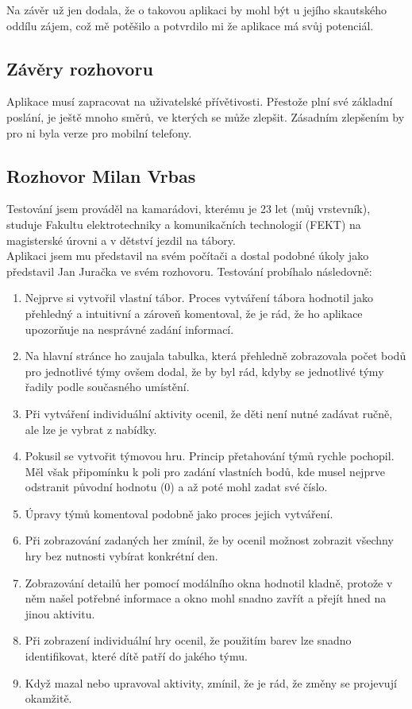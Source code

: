 \documentclass[a4paper, 12pt]{article} %
\begin{document}
Na závěr už jen dodala, že o takovou aplikaci by mohl být u jejího skautského oddílu zájem, což mě potěšilo a potvrdilo mi že aplikace má svůj potenciál.

\subsection*{Závěry rozhovoru}
Aplikace musí zapracovat na uživatelské přívětivosti. Přestože plní své základní poslání, je ještě mnoho směrů, ve kterých se může zlepšit. Zásadním zlepšením by pro ni byla verze pro mobilní telefony. 

\subsection{Rozhovor Milan Vrbas}
Testování jsem prováděl na kamarádovi, kterému je 23 let (můj vrstevník), studuje Fakultu 
elektrotechniky a komunikačních technologií (FEKT) na magisterské úrovni a v dětství jezdil 
na tábory. \\
Aplikaci jsem mu představil na svém počítači a dostal podobné úkoly jako představil Jan Juračka
ve svém rozhovoru. Testování probíhalo následovně:
\begin{enumerate}
    \item Nejprve si vytvořil vlastní tábor. Proces vytváření tábora hodnotil jako přehledný 
    a intuitivní a zároveň komentoval, že je rád, že ho aplikace upozorňuje na nesprávné 
    zadání informací.
    \item Na hlavní stránce ho zaujala tabulka, která přehledně zobrazovala počet bodů pro 
    jednotlivé týmy ovšem dodal, že by byl rád, kdyby se jednotlivé týmy řadily podle 
    současného umístění.
    \item Při vytváření individuální aktivity ocenil, že děti není nutné zadávat ručně, ale 
    lze je vybrat z nabídky.
    \item Pokusil se vytvořit týmovou hru. Princip přetahování týmů rychle pochopil. Měl však 
    připomínku k poli pro zadání vlastních bodů, kde musel nejprve odstranit původní hodnotu 
    (0) a až poté mohl zadat své číslo.
    \item Úpravy týmů komentoval podobně jako proces jejich vytváření.
    \item Při zobrazování zadaných her zmínil, že by ocenil možnost zobrazit všechny hry bez 
    nutnosti vybírat konkrétní den.
    \item Zobrazování detailů her pomocí modálního okna hodnotil kladně, protože v něm našel 
    potřebné informace a okno mohl snadno zavřít a přejít hned na jinou aktivitu.
    \item Při zobrazení individuální hry ocenil, že použitím barev lze snadno identifikovat, 
    které dítě patří do jakého týmu.
    \item Když mazal nebo upravoval aktivity, zmínil, že je rád, že změny se projevují okamžitě.
\end{enumerate}
\end{document}
